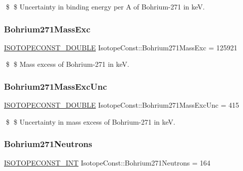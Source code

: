 \$ \$ Uncertainty in binding energy per A of Bohrium-\/271 in keV. \mbox{\label{group___isotope_const-_bohrium-_bh271_gada5f8e3f6544029d344bb2a282d8fd58}} 
\subsubsection{\texorpdfstring{Bohrium271\+Mass\+Exc}{Bohrium271MassExc}}
{\footnotesize\ttfamily \mbox{\hyperlink{group___isotope_const-_macros_ga8f45a7272ce02c0b4c65c44636ed719a}{I\+S\+O\+T\+O\+P\+E\+C\+O\+N\+S\+T\+\_\+\+D\+O\+U\+B\+LE}} Isotope\+Const\+::\+Bohrium271\+Mass\+Exc = 125921}

\$ \$ Mass excess of Bohrium-\/271 in keV. \mbox{\label{group___isotope_const-_bohrium-_bh271_ga1ddae73fe76937f14475a4e1d076adf8}} 
\subsubsection{\texorpdfstring{Bohrium271\+Mass\+Exc\+Unc}{Bohrium271MassExcUnc}}
{\footnotesize\ttfamily \mbox{\hyperlink{group___isotope_const-_macros_ga8f45a7272ce02c0b4c65c44636ed719a}{I\+S\+O\+T\+O\+P\+E\+C\+O\+N\+S\+T\+\_\+\+D\+O\+U\+B\+LE}} Isotope\+Const\+::\+Bohrium271\+Mass\+Exc\+Unc = 415}

\$ \$ Uncertainty in mass excess of Bohrium-\/271 in keV. \mbox{\label{group___isotope_const-_bohrium-_bh271_gac0ee85c39ede80a9c814e9f0d6d41b16}} 
\subsubsection{\texorpdfstring{Bohrium271\+Neutrons}{Bohrium271Neutrons}}
{\footnotesize\ttfamily \mbox{\hyperlink{group___isotope_const-_macros_ga5f18360b3e99483a35c32d789e62621c}{I\+S\+O\+T\+O\+P\+E\+C\+O\+N\+S\+T\+\_\+\+I\+NT}} Isotope\+Const\+::\+Bohrium271\+Neutrons = 164}

